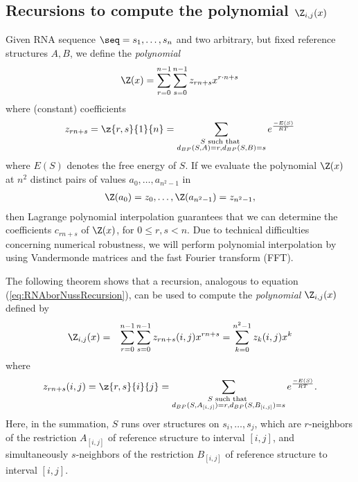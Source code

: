 \subsection{Recursions to compute the polynomial $\Z_{i,j}(x)$}
\label{section:recursionsForPolynomialZij}

Given RNA sequence $\seq = s_1,\ldots,s_n$
and two arbitrary, but fixed reference
structures $A,B$, we define the {\em polynomial}
\begin{eqnarray}
\label{eq:polynomialYann}
\Z(x) = \sum_{r=0}^{n-1} \sum_{s=0}^{n-1}  z_{rn+s} x^{r\cdot n + s}
\end{eqnarray}
where (constant) coefficients
\[ z_{rn+s}= \z{r,s}{1}{n} =
\sum_{\substack{S \text{ such that }\\
d_{BP}(S,A)=r, d_{BP}(S,B)=s}}
e^{\frac{-E(S)}{RT}}
\]
where $E(S)$ denotes the free energy of $S$.
If we evaluate the polynomial $\Z(x)$ at $n^2$ distinct pairs of values
$a_0,\ldots,a_{n^2-1}$ in
\begin{eqnarray}
\label{eq:ZofX}
\Z(a_{0}) = z_{0},\ldots, \Z(a_{n^2-1}) = z_{n^2-1},
\end{eqnarray}
then Lagrange polynomial interpolation
guarantees that we can determine the coefficients $c_{rn+s}$ of $\Z(x)$,
for $0\leq r,s < n$. Due to technical difficulties concerning numerical
robustness, we will perform polynomial interpolation by using Vandermonde
matrices and the fast Fourier transform (FFT).

The following theorem shows that a
recursion, analogous to equation (\ref{eq:RNAborNussRecursion}),
can be used to compute
the {\em polynomial} $\Z_{i,j}(x)$ defined by
\begin{eqnarray}
\label{eq:defZijpolynomial}
\Z_{i,j}(x) &=& \sum_{r=0}^{n-1} \sum_{s=0}^{n-1}
z_{rn+s}(i,j) x^{rn+s}
=\sum_{k=0}^{n^2-1} z_{k}(i,j) x^{k}
\end{eqnarray}
where
\[ z_{rn+s}(i,j)= \z{r,s}{i}{j} =
\sum_{\substack{S \text{ such that }\\
d_{BP}(S,A_{[i,j]})=r, d_{BP}(S,B_{[i,j]})=s}}
e^{\frac{-E(S)}{RT}}.
\]
Here, in the summation, $S$ runs over structures on $s_i,\ldots,s_j$, which
are $r$-neighbors of the restriction $A_{[i,j]}$ of reference structure
\strA to interval $[i,j]$, and simultaneously
$s$-neighbors of the restriction $B_{[i,j]}$ of reference structure
\strB to interval $[i,j]$.
\medskip

